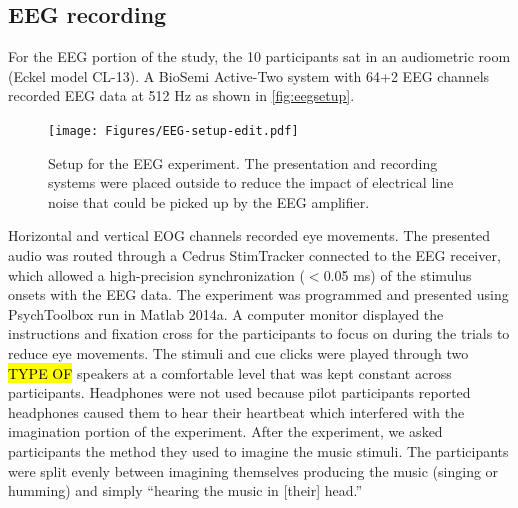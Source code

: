 \subsection{EEG recording}
For the EEG portion of the study, the 10 participants sat in an audiometric room (Eckel model CL-13). 
A BioSemi Active-Two system with 64+2 EEG channels recorded EEG data at 512 Hz as shown in \autoref{fig:eegsetup}.
\begin{figure}[htb]
  \begin{center}
    \texttt{[image: Figures/EEG-setup-edit.pdf]}
    \caption{%
Setup for the EEG experiment.
The presentation and recording systems were placed outside to reduce the impact of electrical line noise that could be picked up by the EEG amplifier.
}
    \label{fig:eegsetup}
  \end{center}
\end{figure}
Horizontal and vertical EOG channels recorded eye movements. 
The presented audio %
was routed through a Cedrus StimTracker connected to the EEG receiver, which allowed a high-precision synchronization ($<$0.05 ms) of the stimulus onsets with the \ac{EEG} data.
The experiment was programmed and presented using PsychToolbox run in Matlab 2014a. 
A computer monitor displayed the instructions and fixation cross for the participants to focus on during the trials to reduce eye movements.
The stimuli and cue clicks were played through two \hl{TYPE OF} speakers at a comfortable level that was kept constant across participants. Headphones were not used because pilot participants reported headphones caused them to hear their heartbeat which interfered with the imagination portion of the experiment. 
After the experiment, we asked participants the method they used to imagine the music stimuli.
The participants were split evenly between imagining themselves producing the music (singing or humming) and simply ``hearing the music in [their] head.'' 

